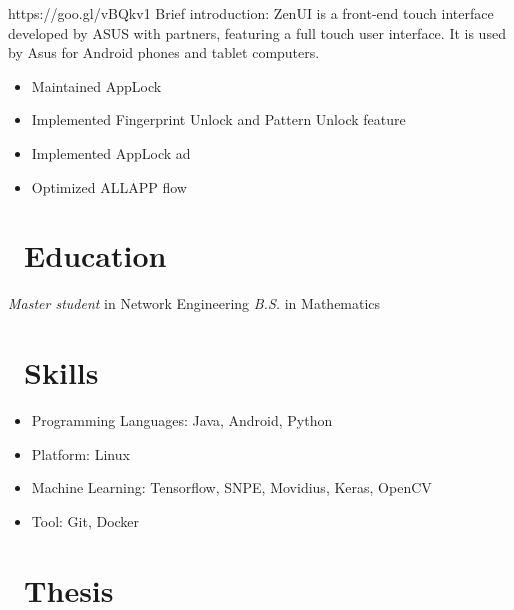 \documentclass{resume}
\begin{document}
 {https://goo.gl/vBQkv1}
Brief introduction: ZenUI is a front-end touch interface developed by ASUS with partners, featuring a full touch user interface. It is used by Asus for Android phones and tablet computers. 
\begin{itemize}
  \item Maintained AppLock
  \item Implemented Fingerprint Unlock and Pattern Unlock feature
  \item Implemented AppLock ad
  \item Optimized ALLAPP flow
\end{itemize}

\section{\faGraduationCap\ Education}
\textit{Master student} in Network Engineering
\textit{B.S.} in Mathematics


\section{\faCogs\ Skills}
\begin{itemize}[parsep=0.5ex]
  \item Programming Languages: Java, Android, Python
  \item Platform: Linux
  \item Machine Learning: Tensorflow, SNPE, Movidius, Keras, OpenCV
  \item Tool: Git, Docker
\end{itemize}

\section {\faTasks\ Thesis}
 {}
\end{document}
